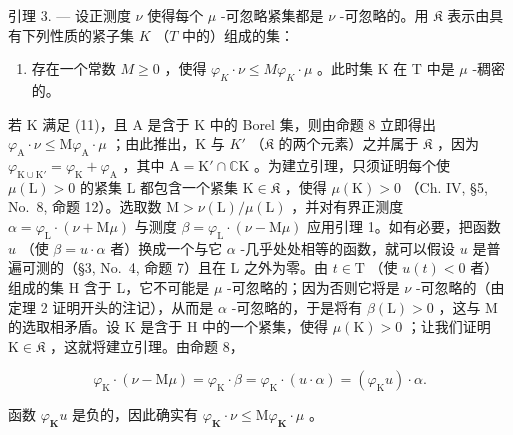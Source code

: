 引理 3. --- 设正测度 \(\nu\) 使得每个 \(\mu\) -可忽略紧集都是 \(\nu\) -可忽略的。用 \(\mathfrak{K}\) 表示由具有下列性质的紧子集 \(K\) （\(T\) 中的）组成的集：

\begin{enumerate}
\def\labelenumi{(\arabic{enumi})}
\setcounter{enumi}{10}
\tightlist
\item
  存在一个常数 \(M \geqslant 0\) ，使得 \(\varphi_{K} \cdot \nu \leqslant M \varphi_{K} \cdot \mu\) 。此时集 K 在 T 中是 \(\mu\) -稠密的。
\end{enumerate}

若 K 满足 (11)，且 A 是含于 K 中的 Borel 集，则由命题 8 立即得出 \(\varphi_{\mathrm{A}} \cdot \nu \leqslant \mathrm{M}\varphi_{\mathrm{A}} \cdot \mu\) ；由此推出，K 与 \(K'\) （\(\mathfrak{K}\) 的两个元素）之并属于 \(\mathfrak{K}\) ，因为 \(\varphi_{\mathrm{K} \cup \mathrm{K}'} = \varphi_{\mathrm{K}} + \varphi_{\mathrm{A}}\) ，其中 \(\mathrm{A} = \mathrm{K}' \cap \mathbb{C}\mathrm{K}\) 。为建立引理，只须证明每个使 \(\mu(\mathrm{L}) > 0\) 的紧集 L 都包含一个紧集 \(\mathrm{K} \in \mathfrak{K}\) ，使得 \(\mu(\mathrm{K}) > 0\) （Ch. IV, §5, No.~8, 命题 12）。选取数 \(\mathrm{M} > \nu(\mathrm{L}) / \mu(\mathrm{L})\) ，并对有界正测度 \(\alpha = \varphi_{\mathrm{L}} \cdot (\nu + \mathrm{M}\mu)\) 与测度 \(\beta = \varphi_{\mathrm{L}} \cdot (\nu - \mathrm{M}\mu)\) 应用引理 1。如有必要，把函数 \(u\) （使 \(\beta = u \cdot \alpha\) 者）换成一个与它 \(\alpha\) -几乎处处相等的函数，就可以假设 \(u\) 是普遍可测的（§3, No.~4, 命题 7）且在 L 之外为零。由 \(t \in \mathrm{T}\) （使 \(u(t) < 0\) 者）组成的集 H 含于 L，它不可能是 \(\mu\) -可忽略的；因为否则它将是 \(\nu\) -可忽略的（由定理 2 证明开头的注记），从而是 \(\alpha\) -可忽略的，于是将有 \(\beta(\mathrm{L}) > 0\) ，这与 M 的选取相矛盾。设 K 是含于 H 中的一个紧集，使得 \(\mu(\mathrm{K}) > 0\) ；让我们证明 \(\mathrm{K} \in \mathfrak{K}\) ，这就将建立引理。由命题 8，

\[
\varphi_ {\mathrm{K}} \cdot (\nu - \mathrm{M} \mu) = \varphi_ {\mathrm{K}} \cdot \beta = \varphi_ {\mathrm{K}} \cdot (u \cdot \alpha) = (\varphi_ {\mathrm{K}} u) \cdot \alpha .
\]

函数 \(\varphi_{\mathbf{K}}u\) 是负的，因此确实有 \(\varphi_{\mathbf{K}}\cdot \nu \leqslant \mathrm{M}\varphi_{\mathbf{K}}\cdot \mu\) 。

